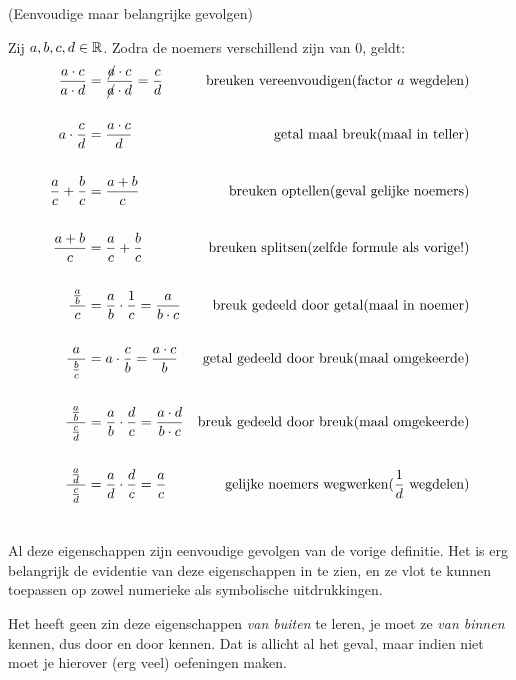 \documentclass{ximera}
\begin{document}
\begin{proposition} (Eenvoudige maar belangrijke gevolgen)
\nopagebreak[4]    %
	
	Zij $a,b,c,d\in \mathbb{R}$. Zodra de noemers verschillend zijn van $0$, geldt:
{
\begin{align*}
		\frac{a\cdot c}{a\cdot d} &= 	\frac{\cancel{a}\cdot c}{\cancel{a}\cdot d} = \frac{c}{d} 
			& \text{breuken vereenvoudigen} \hfill\text{(factor $a$ wegdelen)} \\ \\
		a\cdot \frac{c}{d}   &= \frac{a\cdot c}{d} 
			& \text{getal maal breuk}\hfill \text{(maal in teller)} \\ \\
		\frac{a}{c}+\frac{b}{c}  &= \frac{a+b}{c} 
			& \text{breuken optellen}\hfill\text{(geval gelijke noemers)} \\ \\
		\frac{a+b}{c} &= \frac{a}{c}+\frac{b}{c}  
			& \text{breuken splitsen} \hfill\text{(zelfde formule als vorige!)}\\ \\
		\frac{\frac{a}{b}}{\ c\ } &= \frac ab \cdot \frac 1c = \frac{a}{b\cdot c} 
		& \text{breuk gedeeld door getal}\hfill\text{(maal in noemer)}\\ \\
		\frac{a}{\ \frac{b}{c}\ } &= a\cdot \frac cb = \frac{a\cdot c}{b}
		& \text{getal gedeeld door breuk}\hfill\text{(maal omgekeerde)}\\ \\
		\frac{\frac{a}{b}}{\ \frac{c}{d}\ } &= \frac ab \cdot \frac dc =  \frac{a\cdot d}{b\cdot c}
		& \text{breuk gedeeld door breuk}\hfill\text{(maal omgekeerde)}\\ \\
		\frac{\frac{a}{d}}{\ \frac{c}{d}\ } &= \frac ad \cdot \frac dc =  \frac{a}{c}
		& \text{gelijke noemers wegwerken}\hfill\text{($\frac 1d$ wegdelen)}\\ \\
		\end{align*}
}
\end{proposition}


Al deze eigenschappen zijn eenvoudige gevolgen van de vorige definitie. Het is erg belangrijk de evidentie van deze eigenschappen in te zien, en ze vlot te kunnen toepassen op zowel numerieke als symbolische uitdrukkingen.

Het heeft geen zin deze eigenschappen \textit{van buiten} te leren, je moet ze \textit{van binnen} kennen, dus door en door kennen. Dat is allicht al het geval, maar indien niet moet je hierover (erg veel) oefeningen maken.
\end{document}
